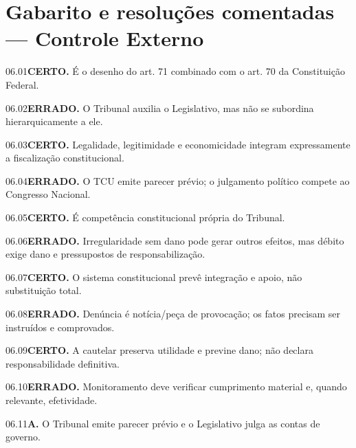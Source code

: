 \section{Gabarito e resoluções comentadas — Controle Externo}

\begin{solucao}{06.01}\textbf{CERTO.} É o desenho do art. 71 combinado com o art. 70 da Constituição Federal.\end{solucao}
\begin{solucao}{06.02}\textbf{ERRADO.} O Tribunal auxilia o Legislativo, mas não se subordina hierarquicamente a ele.\end{solucao}
\begin{solucao}{06.03}\textbf{CERTO.} Legalidade, legitimidade e economicidade integram expressamente a fiscalização constitucional.\end{solucao}
\begin{solucao}{06.04}\textbf{ERRADO.} O TCU emite parecer prévio; o julgamento político compete ao Congresso Nacional.\end{solucao}
\begin{solucao}{06.05}\textbf{CERTO.} É competência constitucional própria do Tribunal.\end{solucao}
\begin{solucao}{06.06}\textbf{ERRADO.} Irregularidade sem dano pode gerar outros efeitos, mas débito exige dano e pressupostos de responsabilização.\end{solucao}
\begin{solucao}{06.07}\textbf{CERTO.} O sistema constitucional prevê integração e apoio, não substituição total.\end{solucao}
\begin{solucao}{06.08}\textbf{ERRADO.} Denúncia é notícia/peça de provocação; os fatos precisam ser instruídos e comprovados.\end{solucao}
\begin{solucao}{06.09}\textbf{CERTO.} A cautelar preserva utilidade e previne dano; não declara responsabilidade definitiva.\end{solucao}
\begin{solucao}{06.10}\textbf{ERRADO.} Monitoramento deve verificar cumprimento material e, quando relevante, efetividade.\end{solucao}
\begin{solucao}{06.11}\textbf{A.} O Tribunal emite parecer prévio e o Legislativo julga as contas de governo.\end{solucao}
